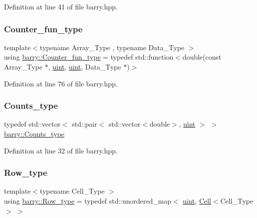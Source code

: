 Definition at line 41 of file barry.\+hpp.

\mbox{\label{namespacebarry_abaaae3200da8e4b7faac3c04fe9c3081}} 
\subsubsection{\texorpdfstring{Counter\+\_\+fun\+\_\+type}{Counter\_fun\_type}}
{\footnotesize\ttfamily template$<$typename Array\+\_\+\+Type , typename Data\+\_\+\+Type $>$ \\
using \hyperlink{namespacebarry_abaaae3200da8e4b7faac3c04fe9c3081}{barry\+::\+Counter\+\_\+fun\+\_\+type} = typedef std\+::function$<$double(const Array\+\_\+\+Type $\ast$, \hyperlink{namespacebarry_a11dfc53ddb4672278319aa04f1e09a6c}{uint}, \hyperlink{namespacebarry_a11dfc53ddb4672278319aa04f1e09a6c}{uint}, Data\+\_\+\+Type $\ast$)$>$}



Definition at line 76 of file barry.\+hpp.

\mbox{\label{namespacebarry_a3e2d8c3b6cf602107559d4237d9f1315}} 
\subsubsection{\texorpdfstring{Counts\+\_\+type}{Counts\_type}}
{\footnotesize\ttfamily typedef std\+::vector$<$ std\+::pair$<$ std\+::vector$<$double$>$, \hyperlink{namespacebarry_a11dfc53ddb4672278319aa04f1e09a6c}{uint} $>$ $>$ \hyperlink{namespacebarry_a3e2d8c3b6cf602107559d4237d9f1315}{barry\+::\+Counts\+\_\+type}}



Definition at line 32 of file barry.\+hpp.

\mbox{\label{namespacebarry_a8f67f2e1e26f3cb10d240b7e1a1d917c}} 
\subsubsection{\texorpdfstring{Row\+\_\+type}{Row\_type}}
{\footnotesize\ttfamily template$<$typename Cell\+\_\+\+Type $>$ \\
using \hyperlink{namespacebarry_a8f67f2e1e26f3cb10d240b7e1a1d917c}{barry\+::\+Row\+\_\+type} = typedef std\+::unordered\+\_\+map$<$ \hyperlink{namespacebarry_a11dfc53ddb4672278319aa04f1e09a6c}{uint}, \hyperlink{classbarry_1_1_cell}{Cell}$<$Cell\+\_\+\+Type$>$ $>$}



